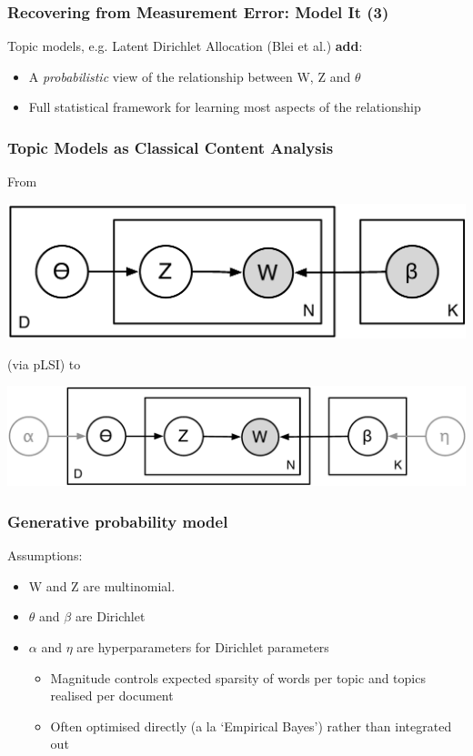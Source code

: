 \documentclass[11pt,compress,professionalfonts]{beamer}
\newcommand{\ita}{\begin{itemize}}
\newcommand{\itm}{\item[]}
\newcommand{\itz}{\end{itemize}}
\begin{document}
\begin{frame}[t]\frametitle{Recovering from Measurement Error: Model It (3)}

Topic models, e.g. Latent Dirichlet Allocation (Blei et al.) \textbf{add}:
\ita
\itm A \textit{probabilistic} view of the relationship between W, Z and $\theta$
\itm Full statistical framework for learning most aspects of the relationship
\itz

\end{frame}
\begin{frame}[t]\frametitle{Topic Models as Classical Content Analysis}

From

\centerline{\includegraphics[scale=.8]{pictures/new-topics-ca}}

(via pLSI) to

\centerline{\includegraphics[scale=.8]{pictures/lda-flat}}

\end{frame}
\begin{frame}[t]\frametitle{Generative probability model}

Assumptions:
\ita
\itm W and Z are multinomial.
\itm $\theta$ and $\beta$ are Dirichlet
\itm $\alpha$ and $\eta$ are hyperparameters for Dirichlet parameters
\ita
\item Magnitude controls expected sparsity of words per topic and topics realised per document
\item Often optimised directly (a la `Empirical Bayes') rather than integrated out
\itz
\itz

\end{frame}
\end{document}
